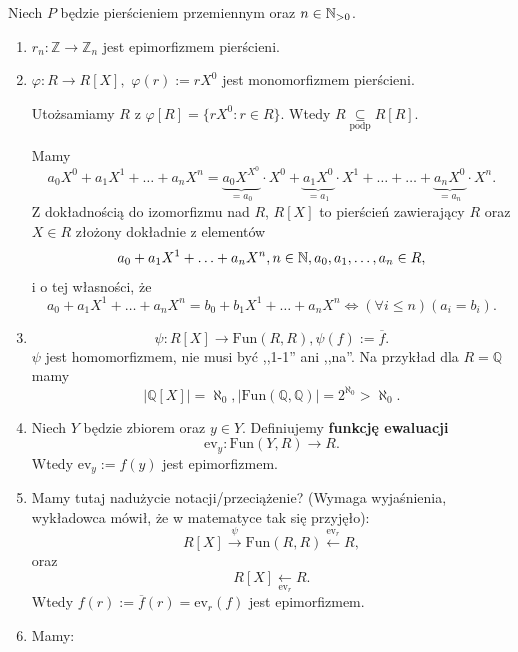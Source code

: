 Niech $P$ będzie pierścieniem przemiennym oraz $n\in \mathbb{N}_{>0}$.
\begin{enumerate}[label=\arabic*)]
	\item $r_{n}: \mathbb{Z} \to \mathbb{Z} _{n} $ jest epimorfizmem pierścieni.
	\item $\varphi : R \to R\left[ X \right],$ $\varphi \left( r \right) := rX^{0} $ jest monomorfizmem pierścieni.
	
		Utożsamiamy $R$ z $\varphi \left[ R \right] =\{rX^{0}: r\in R\}  $. Wtedy $R \underset{\scriptscriptstyle\text{podp}}{\subseteq} R\left[ R \right] $.

		\begin{remark}
			Mamy
			\[
			a_0X^{0}+ a_1X^{1}+\ldots + a_{n} X^{n} = \underbrace{a_0X^{X^{0}}}_{=a_0}\cdot X^{0}+ \underbrace{a_1X^{0}}_{=a_1}\cdot X^{1}+ \ldots + \ldots + \underbrace{a_{n} X^{0}}_{=a_{n} }\cdot X^{n}
			.\] 
			Z dokładnością do izomorfizmu nad $R$, $R\left[ X \right] $ to pierścień zawierający $R$ oraz $X\in R$ złożony dokładnie z elementów \[
			a_0 + a_1X^{1} + \ldots + a_{n}X^{n}, n\in \mathbb{N}, a_0,a_1,\ldots,a_{n} \in R
			,\] 
			i o tej własności, że
			\[
			a_0 + a_1X^{1} + \ldots + a_{n} X^{n} = b_0 + b_1X^{1} + \ldots + a_{n} X^{n} \iff \left(\forall i\le n \right)\left( a_{i}= b_{i} \right)  
			.\] 
		\end{remark}
	\item \[
	 	\psi : R\left[ X \right] \to \text{Fun}\left( R,R \right), \psi \left( f \right) := \overline{f}
	.\] 
	$\psi $ jest homomorfizmem, nie musi być ,,1-1'' ani ,,na''.
	Na przykład dla $R = \mathbb{Q} $ mamy 
	\[
	\left| \mathbb{Q} \left[ X \right]  \right| = \aleph_{0}, \left| \text{Fun}\left( \mathbb{Q} ,\mathbb{Q}  \right)  \right|= 2^{\aleph_{0}}> \aleph_{0}
	.\] 
\item Niech $Y$ będzie zbiorem oraz $y \in Y$. Definiujemy \textbf{funkcję ewaluacji} 
	\[
	\text{ev}_{y}: \text{Fun}\left( Y, R \right) \to R
	.\] 
	Wtedy $\text{ev}_{y} := f\left( y \right) $ jest epimorfizmem.
\item Mamy tutaj nadużycie notacji/przeciążenie? (Wymaga wyjaśnienia, wykładowca mówił, że w matematyce tak się przyjęło):
	\[
	R\left[ X \right] \overset{\psi }{\longrightarrow} \text{Fun}\left( R,R \right) \overset{\text{ev}_{r}}{\leftarrow }R
	,\] 
	oraz
	\[
		R\left[ X \right] \underset{\text{ev}_{r}}{\leftarrow } R
	.\] 
	Wtedy $f\left( r \right) := \overline{f}\left( r \right) = \text{ev}_{r}\left( f \right) $ jest epimorfizmem. 
\item Mamy:


\end{enumerate}
